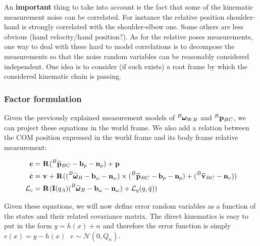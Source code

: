 \documentclass[11pt]{article}
\newcommand{\Rot}[2]{\prescript{#1}{}{\bfR}_{#2}}
\newcommand{\noise}{\bfn}
\newcommand{\bias}{\bfb}
\newcommand{\posi}[2]{\prescript{#1}{}{\bfp}_{#2}}
\newcommand{\posim}[2]{\prescript{#1}{}{\widetilde{\bfp}}_{#2}}
\newcommand{\vel}[2]{\prescript{#1}{}{\bfv}_{#2}}
\newcommand{\velm}[2]{\prescript{#1}{}{\widetilde{\bfv}}_{#2}}
\newcommand{\angvel}[2]{\prescript{#1}{}{\pmb{\omega}}_{#2}}
\newcommand{\angvelm}[2]{\prescript{#1}{}{\widetilde{\pmb{\omega}}}_{#2}}
\newcommand{\AM}{\mathcal{L}}
\newcommand{\COM}{\bfc}
\newcommand{\COMd}{\dot{\bfc}}
\newcommand{\Gaussian}[2]{\mathcal{N}({#1},{#2})}
\begin{document}
An \textbf{important} thing to take into account is the fact that some of the kinematic measurement noise can be correlated. For instance the relative position shoulder-hand is strongly correlated with the shoulder-elbow one. Some others are less obvious (hand velocity/hand position?). As for the relative poses measurements, one way to deal with these hard to model correlations is to decompose the measurements so that the noise random variables can be reasonably considered independent. One idea is to consider (if such exists) a root frame by which the considered kinematic chain is passing.

\subsubsection{Factor formulation}

Given the previously explained measurement models of $\angvel{B}{WB}$ and $\posi{B}{BC}$, we can project these equations in the world frame. We also add a relation between the COM position expressed in the world frame and its body frame relative measurement:

\begin{equation}
\begin{split}
\COM &= \Rot{}{} (\posim{B}{BC} -  \bias_{p} - \noise_p) + \posi{}{}
\\
\COMd &= \vel{}{} + \Rot{}{}((\angvelm{B}{B} - \bias_{\omega} - \noise_{\omega}) \times (\posim{B}{BC} -  \bias_{p} - \noise_p) + (\velm{B}{BC} - \noise_v))
\\
\AM_c &= \Rot{}{}(\bfI(q_A) (\angvelm{B}{B} - \bias_{\omega} - \noise_{\omega}) + \AM_q (q,\dot{q}))
\end{split}
\end{equation}

Given these equations, we will now define error random variables as a function of the states and their related covariance matrix. The direct kinematics is easy to put in the form $y = h(x) + n$ and therefore the error function is simply  $e(x) = y - h(x) ~~~ e \sim \Gaussian{0}{Q_n}$. 
\end{document}
